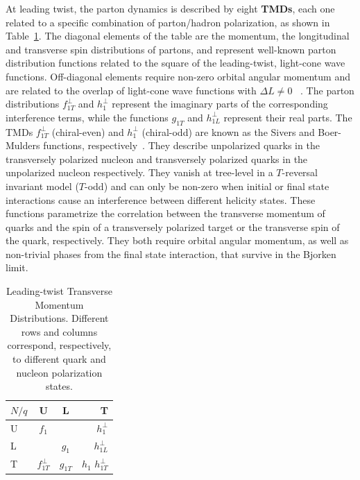 At leading twist, the parton dynamics is described by eight \textbf{TMDs}, each one related to a specific combination of parton/hadron polarization, as shown in Table~\ref{tab::tmds}. 
The diagonal elements of the table are the momentum, the longitudinal and transverse spin distributions of partons, and represent well-known parton distribution functions related to the square of the leading-twist, light-cone wave functions. Off-diagonal elements require non-zero orbital angular momentum and are related to the overlap of light-cone wave functions with $\Delta L \neq 0$ ~\cite{Ji:2002xn}.  The parton distributions $f_{1T}^\perp$ and $h_1^\perp$ represent the imaginary parts of the corresponding interference terms, while the functions $g_{1T}$ and $h_{1L}^\perp$ represent their real parts. The TMDs $f_{1T}^\perp$ (chiral-even) and $h_{1}^\perp$ (chiral-odd) are known as the Sivers and Boer-Mulders functions, respectively~\cite{Sivers:1990fh,Anselmino:1998yz,Brodsky:2002rv,
Collins:2002kn,Ji:2002aa,Belitsky:2002sm}. They describe unpolarized quarks in the transversely polarized nucleon and transversely polarized quarks in the unpolarized nucleon respectively. 
They vanish at tree-level in a $T$-reversal invariant model ($T$-odd) and can only be non-zero when initial or final state interactions cause an interference between different helicity states. These functions parametrize the correlation between the transverse momentum of quarks and the spin of a transversely polarized target or the transverse spin of the quark, respectively. They both require orbital angular momentum, as well as non-trivial phases from the final state interaction, that survive in the Bjorken limit.\\
%
\begin{table}
\centering
\begin{tabular}{l|c|c|r}
$N/q$ & U                 & L        & T                 \\\hline\hline
U     & $f_1$             &          & $h_1^{\perp}$     \\\hline
L     &                   & $g_1$    & $h_{1 L}^{\perp}$ \\\hline
T     & $f_{1 T}^{\perp}$ & $g_{1 T}$ & $h_1$ $h_{1 T}^{\perp}$\\\hline\hline
\end{tabular}
\caption{\label{tab::tmds} Leading-twist Transverse Momentum Distributions. Different rows and columns correspond, respectively, to different quark and nucleon polarization states.}
\end{table}
